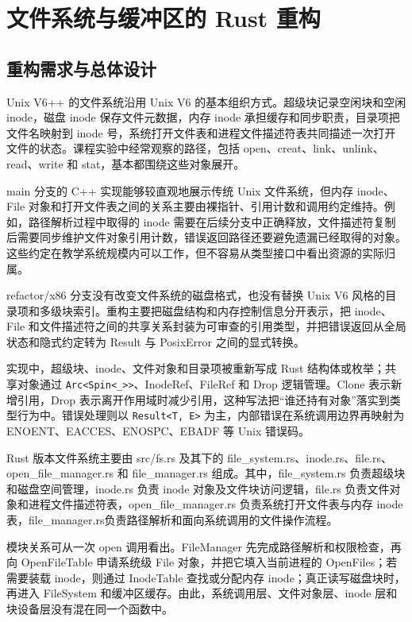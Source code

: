 \chapter{文件系统与缓冲区的 Rust 重构}

\section{重构需求与总体设计}

Unix V6++ 的文件系统沿用 Unix V6 的基本组织方式。超级块记录空闲块和空闲 inode，磁盘 inode 保存文件元数据，内存 inode 承担缓存和同步职责，目录项把文件名映射到 inode 号，系统打开文件表和进程文件描述符表共同描述一次打开文件的状态。课程实验中经常观察的路径，包括 open、creat、link、unlink、read、write 和 stat，基本都围绕这些对象展开。

main 分支的 C++ 实现能够较直观地展示传统 Unix 文件系统，但内存 inode、File 对象和打开文件表之间的关系主要由裸指针、引用计数和调用约定维持。例如，路径解析过程中取得的 inode 需要在后续分支中正确释放，文件描述符复制后需要同步维护文件对象引用计数，错误返回路径还要避免遗漏已经取得的对象。这些约定在教学系统规模内可以工作，但不容易从类型接口中看出资源的实际归属。

refactor/x86 分支没有改变文件系统的磁盘格式，也没有替换 Unix V6 风格的目录项和多级块索引。重构主要把磁盘结构和内存控制信息分开表示，把 inode、File 和文件描述符之间的共享关系封装为可审查的引用类型，并把错误返回从全局状态和隐式约定转为 Result 与 PosixError 之间的显式转换。

实现中，超级块、inode、文件对象和目录项被重新写成 Rust 结构体或枚举；共享对象通过 \texttt{Arc<Spin<\_>>}、InodeRef、FileRef 和 Drop 逻辑管理。Clone 表示新增引用，Drop 表示离开作用域时减少引用，这种写法把“谁还持有对象”落实到类型行为中。错误处理则以 \texttt{Result<T, E>} 为主，内部错误在系统调用边界再映射为 ENOENT、EACCES、ENOSPC、EBADF 等 Unix 错误码。

Rust 版本文件系统主要由 src/fs.rs 及其下的 file\_system.rs、inode.rs、file.rs、open\_file\_manager.rs 和 file\_manager.rs 组成。其中，file\_system.rs 负责超级块和磁盘空间管理，inode.rs 负责 inode 对象及文件块访问逻辑，file.rs 负责文件对象和进程文件描述符表，open\_file\_manager.rs 负责系统打开文件表与内存 inode 表，file\_manager.rs负责路径解析和面向系统调用的文件操作流程。

模块关系可从一次 open 调用看出。FileManager 先完成路径解析和权限检查，再向 OpenFileTable 申请系统级 File 对象，并把它填入当前进程的 OpenFiles；若需要装载 inode，则通过 InodeTable 查找或分配内存 inode；真正读写磁盘块时，再进入 FileSystem 和缓冲区缓存。由此，系统调用层、文件对象层、inode 层和块设备层没有混在同一个函数中。

